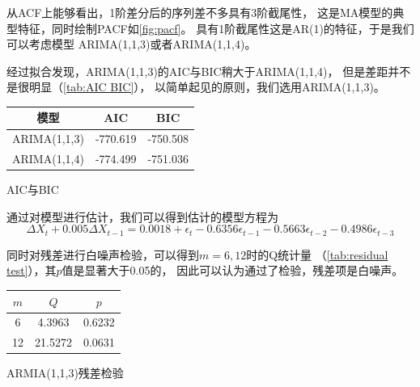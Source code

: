 \documentclass[cn]{homework}
\begin{document}
\begin{subproblem}[(\alph*)]
        从ACF上能够看出，1阶差分后的序列差不多具有3阶截尾性，
        这是MA模型的典型特征，同时绘制PACF如\cref{fig:pacf}。
        具有1阶截尾性这是AR(1)的特征，于是我们可以考虑模型
        ARIMA(1,1,3)或者ARIMA(1,1,4)。

        经过拟合发现，ARIMA(1,1,3)的AIC与BIC稍大于ARIMA(1,1,4)，
        但是差距并不是很明显（\cref{tab:AIC BIC}），
        以简单起见的原则，我们选用ARIMA(1,1,3)。

        \begin{margintable}
            \centering
            \begin{tabular}{ccc}
                \toprule
                模型 & AIC & BIC\\
                \midrule
                ARIMA(1,1,3) & -770.619& -750.508\\ 
                ARIMA(1,1,4) & -774.499 & -751.036\\
                \bottomrule
            \end{tabular}
            \caption{AIC与BIC}
            \label{tab:AIC BIC}
        \end{margintable}

        通过对模型进行估计，我们可以得到估计的模型方程为
        \[\Delta X_t+0.005\Delta X_{t-1}=0.0018+\epsilon_t-0.6356\epsilon_{t-1}
        -0.5663\epsilon_{t-2}-0.4986\epsilon_{t-3}\]

        同时对残差进行白噪声检验，可以得到$m=6,12$时的Q统计量
        （\cref{tab:residual test}），其$p$值是显著大于0.05的，
        因此可以认为通过了检验，残差项是白噪声。

        \begin{margintable}
            \centering
            \begin{tabular}{ccc}
                \toprule
                $m$ & $Q$ & $p$ \\
                \midrule
                6 & 4.3963 & 0.6232\\
                12 & 21.5272 & 0.0631\\
                \bottomrule
            \end{tabular}
            \caption{ARMIA(1,1,3)残差检验}
            \label{tab:residual test}
        \end{margintable}


\end{subproblem}
\end{document}
